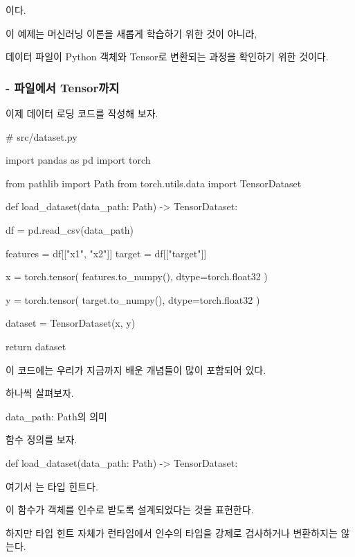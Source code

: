 이다.

이 예제는 머신러닝 이론을 새롭게 학습하기 위한 것이 아니라,

데이터 파일이 Python 객체와 Tensor로 변환되는 과정을 확인하기 위한 것이다.

\subsubsection{ - 파일에서 Tensor까지}

이제 데이터 로딩 코드를 작성해 보자.

\begin{dhkcode}
# src/dataset.py

import pandas as pd
import torch

from pathlib import Path
from torch.utils.data import TensorDataset

def load_dataset(data_path: Path) -> TensorDataset:

    df = pd.read_csv(data_path)

    features = df[["x1", "x2"]]
    target = df[["target"]]

    x = torch.tensor(
        features.to_numpy(),
        dtype=torch.float32
    )

    y = torch.tensor(
        target.to_numpy(),
        dtype=torch.float32
    )

    dataset = TensorDataset(x, y)

    return dataset
\end{dhkcode}

이 코드에는 우리가 지금까지 배운 개념들이 많이 포함되어 있다.

하나씩 살펴보자.

\begin{dhknote}
\begin{dhksmry}[centered]
data_path: Path의 의미
\end{dhksmry}
\end{dhknote}

함수 정의를 보자.

\begin{dhkcode}
def load_dataset(data_path: Path) -> TensorDataset:
\end{dhkcode}

여기서 는 타입 힌트다.

이 함수가  객체를 인수로 받도록 설계되었다는 것을 표현한다.

하지만 타입 힌트 자체가 런타임에서 인수의 타입을 강제로 검사하거나 변환하지는 않는다.

